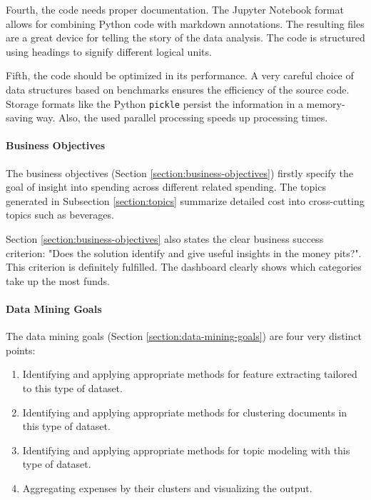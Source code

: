 Fourth, the code needs proper documentation. The Jupyter Notebook format allows for combining Python code with markdown annotations. The resulting files are a great device for telling the story of the data analysis. The code is structured using headings to signify different logical units.

Fifth, the code should be optimized in its performance. A very careful choice of data structures based on benchmarks ensures the efficiency of the source code. Storage formats like the Python \lstinline|pickle| persist the information in a memory-saving way. Also, the used parallel processing speeds up processing times.

\paragraph{Business Objectives}
The business objectives (Section \ref{section:business-objectives}) firstly specify the goal of insight into spending across different related spending. The topics generated in Subsection \ref{section:topics} summarize detailed cost into cross-cutting topics such as beverages. 



Section \ref{section:business-objectives} also states the clear business success criterion: "Does the solution identify and give useful insights in the money pits?". This criterion is definitely fulfilled. The dashboard clearly shows which categories take up the most funds.


\paragraph{Data Mining Goals}
The data mining goals (Section \ref{section:data-mining-goals}) are four very distinct points:
\begin{enumerate}
	\item Identifying and applying appropriate methods for feature extracting tailored to this type of dataset.
	\item Identifying and applying appropriate methods for clustering documents in this type of dataset.
	\item Identifying and applying appropriate methods for topic modeling with this type of dataset.
	\item Aggregating expenses by their clusters and visualizing the output.
\end{enumerate}


